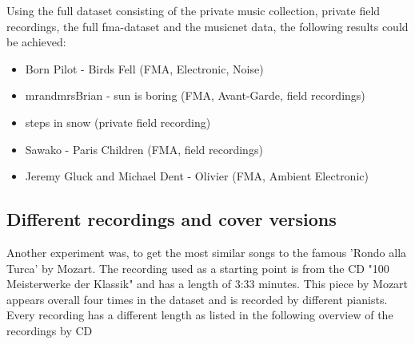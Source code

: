 Using the full dataset consisting of the private music collection, private field recordings, the full fma-dataset and the musicnet data, the following results could be achieved: 

\begin{itemize}
	\setlength\itemsep{-0.5em}
	\item Born Pilot - Birds Fell (FMA, Electronic, Noise)
	\item mrandmrsBrian - sun is boring (FMA, Avant-Garde, field recordings)
	\item steps in snow (private field recording)
	\item Sawako - Paris Children (FMA, field recordings)
	\item Jeremy Gluck and Michael Dent - Olivier (FMA, Ambient Electronic)
	
\end{itemize}

\subsection{Different recordings and cover versions}
Another experiment was, to get the most similar songs to the famous 'Rondo alla Turca' by Mozart.
The recording used as a starting point is from the CD "100 Meisterwerke der Klassik" and has a length of 3:33 minutes.
This piece by Mozart appears overall four times in the dataset and is recorded by different pianists.
Every recording has a different length as listed in the following overview of the recordings by CD

